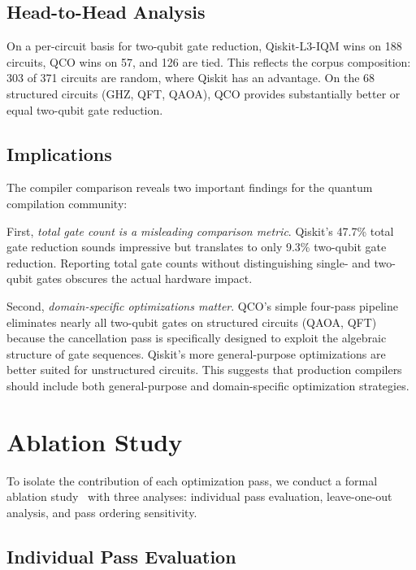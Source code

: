 \documentclass[sigconf,nonacm]{acmart}
\begin{document}
\subsection{Head-to-Head Analysis}

On a per-circuit basis for two-qubit gate reduction, Qiskit-L3-IQM wins on 188 circuits, QCO wins on 57, and 126 are tied. This reflects the corpus composition: 303 of 371 circuits are random, where Qiskit has an advantage. On the 68 structured circuits (GHZ, QFT, QAOA), QCO provides substantially better or equal two-qubit gate reduction.

\subsection{Implications}

The compiler comparison reveals two important findings for the quantum compilation community:

First, \emph{total gate count is a misleading comparison metric}. Qiskit's 47.7\% total gate reduction sounds impressive but translates to only 9.3\% two-qubit gate reduction. Reporting total gate counts without distinguishing single- and two-qubit gates obscures the actual hardware impact.

Second, \emph{domain-specific optimizations matter}. QCO's simple four-pass pipeline eliminates nearly all two-qubit gates on structured circuits (QAOA, QFT) because the cancellation pass is specifically designed to exploit the algebraic structure of gate sequences. Qiskit's more general-purpose optimizations are better suited for unstructured circuits. This suggests that production compilers should include both general-purpose and domain-specific optimization strategies.

\section{Ablation Study}
\label{sec:ablation}

To isolate the contribution of each optimization pass, we conduct a formal ablation study~\cite{meyes2019ablation} with three analyses: individual pass evaluation, leave-one-out analysis, and pass ordering sensitivity.

\subsection{Individual Pass Evaluation}
\end{document}
